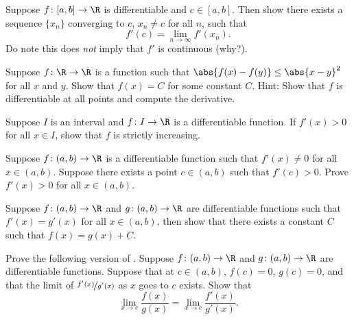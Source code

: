 \documentclass[12pt]{book}
\begin{document}
\begin{exercise}
Suppose $f \colon [a,b] \to \R$ is differentiable and $c \in [a,b]$.
Then show there exists a sequence $\{ x_n \}$ converging to $c$, $x_n
\not= c$ for all $n$, such that
\begin{equation*}
f'(c) = \lim_{n\to \infty} f'(x_n).
\end{equation*}
Do note this does \emph{not} imply that $f'$ is continuous (why?).
\end{exercise}

\begin{exercise}
Suppose $f \colon \R \to \R$ is a function such that
$\abs{f(x)-f(y)} \leq \abs{x-y}^2$ for all $x$ and $y$.
Show that
$f(x) = C$ for some constant $C$.
Hint: Show that $f$ is differentiable
at all points and compute the derivative.
\end{exercise}

\begin{exercise} \label{exercise:posderincr}
Suppose $I$ is an interval and
$f \colon I \to \R$ is a differentiable function.
If $f'(x) > 0$ for all $x \in I$, show that $f$ is strictly increasing.
\end{exercise}

\begin{exercise}
Suppose $f \colon (a,b) \to \R$ is a differentiable function
such that
$f'(x) \not= 0$ for all $x \in (a,b)$.
Suppose there
exists
a point $c \in (a,b)$ such that $f'(c) > 0$.
Prove $f'(x) > 0$ for all $x \in (a,b)$.
\end{exercise}

\begin{exercise} \label{exercise:samediffconst}
Suppose $f \colon (a,b) \to \R$ and $g \colon (a,b) \to \R$ are
differentiable functions such that $f'(x) = g'(x)$ for all $x \in (a,b)$,
then show that there exists a constant $C$ such that $f(x) = g(x) + C$.
\end{exercise}

\begin{exercise}
Prove the following version of .
Suppose 
$f \colon (a,b) \to \R$ and $g \colon (a,b) \to \R$ are differentiable
functions.
Suppose that at $c \in (a,b)$, $f(c) = 0$, $g(c)=0$, and
that the limit of $\nicefrac{f'(x)}{g'(x)}$ as $x$ goes to $c$ exists.
Show that
\begin{equation*}
\lim_{x \to c} \frac{f(x)}{g(x)} = 
\lim_{x \to c} \frac{f'(x)}{g'(x)} .
\end{equation*}
\end{exercise}
\end{document}
